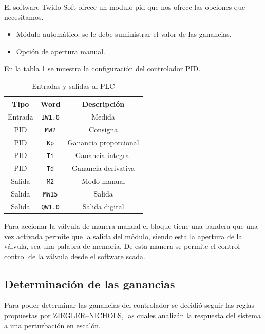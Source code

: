 El software Twido Soft ofrece un modulo \gls{pid} que nos ofrece las
opciones que necesitamos.

\begin{itemize}
 \item Módulo automático: se le debe suministrar el valor de las ganancias. 
 \item Opción de apertura manual.
\end{itemize}

En la tabla \ref{table:controladorpid} se muestra la configuración del 
controlador PID.

\begin{table}[!t]

\renewcommand{\arraystretch}{1.3}
\centering
\begin{tabular}{c||c||c}
\hline
\bfseries Tipo & \bfseries Word  & \bfseries Descripción\\
\hline \hline
Entrada & \verb|IW1.0|  & Medida\\
\hline
PID & \verb|MW2|  & Consigna\\
PID & \verb|Kp|  & Ganancia proporcional\\
PID & \verb|Ti|  & Ganancia integral\\
PID & \verb|Td|  & Ganancia derivativa\\
\hline
Salida & \verb|M2|  & Modo manual\\
Salida & \verb|MW15|  & Salida\\
Salida & \verb|QW1.0|  & Salida digital\\
\hline
\end{tabular}
\caption{Entradas y salidas al PLC}
\label{table:controladorpid}
\end{table}

Para accionar la válvula de manera manual el bloque tiene una bandera
que una vez activada permite que la salida del módulo, siendo esta la 
apertura de la válvula, sea una palabra de memoria. De esta manera se 
permite el control control de la válvula desde el software \gls{scada}.

\subsection{Determinación de las ganancias}

Para poder determinar las ganancias del controlador se decidió seguir
las reglas propuestas por ZIEGLER–NICHOLS, las cuales analizán la respuesta
del sistema a una perturbación en escalón.

